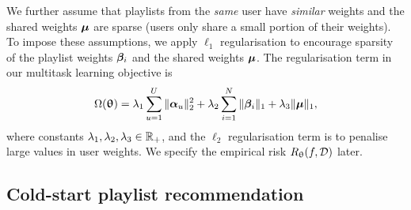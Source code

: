 We further assume that playlists from the \emph{same} user have \emph{similar} weights %
and the shared weights $\bm{\mu}$ are sparse %
(\ie users only share a small portion of their weights).
To impose these assumptions, we apply $\ell_1$ regularisation to encourage sparsity %
of the playlist weights ${\bm{\beta}}_i$ %
and the shared weights $\bm{\mu}$.
%
The regularisation term in our multitask learning objective is
\begin{equation*}
\Omega({\bm{\uptheta}}) 
= \lambda_1 \sum_{u=1}^U \|{\bm{\alpha}}_u\|_2^2 
  + \lambda_2 \sum_{i=1}^N \|{\bm{\beta}}_i\|_1 
  + \lambda_3 \| \bm{\mu} \|_1,
\end{equation*}
where constants $\lambda_1, \lambda_2, \lambda_3 \in \mathbb{R}_+$,
and the $\ell_2$ regularisation term is to penalise large values in user weights. %
We specify the empirical risk $R_{\uptheta}(f, \mathcal{D})$ later.


\subsection{Cold-start playlist recommendation}

